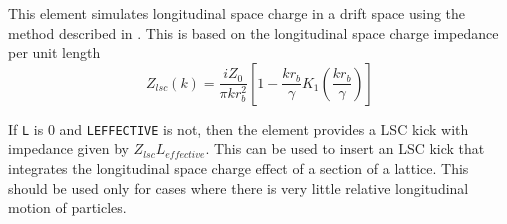 This element simulates longitudinal space charge in a drift space using the
method described in \cite{Huang2004}.  This is based on the 
longitudinal space charge impedance per unit length
\begin{equation}
  Z_{lsc}(k) = \frac{i Z_0}{\pi k r_b^2} \left[ 1 - \frac{kr_b}{\gamma}K_1 \left(\frac{kr_b}{\gamma}\right)\right]
\end{equation}

If {\tt L} is 0 and {\tt LEFFECTIVE} is not, then the element provides a
LSC kick with impedance given by $Z_{lsc} L_{effective}$. This can be used
to insert an LSC kick that integrates the longitudinal space charge effect
of a section of a lattice.  This should be used only for cases 
where there is very little relative longitudinal motion of particles.

